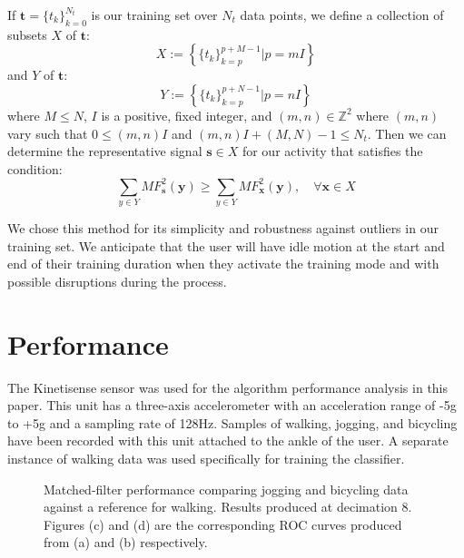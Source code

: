 \documentclass{sciposter}
\begin{document}
\begin{multicols}{3}
If $\textbf{t} = \{t_k\}_{k=0}^{N_t}$ is our training set over $N_t$ data points, we define a collection of subsets $X$ of $\textbf{t}$:
%
\begin{equation} \label{eq:X_subsets_of_training_eq}
X := \left \{ \{t_k\}_{k=p}^{p+M-1} | p=mI \right \}
\end{equation}
%
and $Y$ of $\textbf{t}$:
%
\begin{equation} \label{eq:Y_subsets_of_training_eq}
Y := \left \{ \{t_k\}_{k=p}^{p+N-1} | p=nI \right \}
\end{equation}
%
where $M \leq N$, $I$ is a positive, fixed integer, and $(m,n) \in \mathbb{Z}^2$ where $(m,n)$ vary such that $0 \leq (m,n)I$ and $(m,n)I + (M,N) - 1 \leq N_t$. Then we can determine the representative signal $\textbf{s} \in X$ for our activity that satisfies the condition:
%
\begin{equation} \label{eq:s_condition}
\sum_{y \in Y}MF^2_{\textbf{s}}(\textbf{y}) \geq \sum_{y \in Y}MF^2_{\textbf{x}}(\textbf{y}), \quad \forall \textbf{x} \in X
\end{equation}

We chose this method for its simplicity and robustness against outliers in our training set. We anticipate that the user will have idle motion at the start and end of their training duration when they activate the training mode and with possible disruptions during the process.

\section{Performance}
The Kinetisense sensor was used for the algorithm performance analysis in this paper.
This unit has a three-axis accelerometer with an acceleration range of -5g to +5g and a sampling rate of 128Hz.
Samples of walking, jogging, and bicycling have been recorded with this unit attached to the ankle of the user.
A separate instance of walking data was used specifically for training the classifier.

\begin{figure}[!ht]

\centering
{}

\caption{Matched-filter performance comparing jogging and bicycling data against a reference for walking. Results produced at decimation 8. Figures (c) and (d) are the corresponding ROC curves produced from (a) and (b) respectively.}
  \label{fig:MF_performance}
\end{figure}


\end{multicols}
\end{document}
